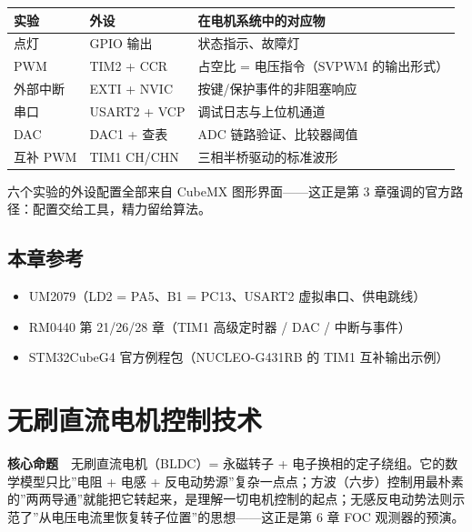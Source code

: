 \documentclass[
  UTF8,
  scheme=plain,
  fontsize=10pt,
  openany
]{ctexbook}
\begin{document}
{\def\LTcaptype{none} %
\begin{longtable}[]{@{}lll@{}}
\toprule\noalign{}
实验 & 外设 & 在电机系统中的对应物 \\
\midrule\noalign{}
\endhead
\bottomrule\noalign{}
\endlastfoot
点灯 & GPIO 输出 & 状态指示、故障灯 \\
PWM & TIM2 + CCR & 占空比 = 电压指令（SVPWM 的输出形式） \\
外部中断 & EXTI + NVIC & 按键/保护事件的非阻塞响应 \\
串口 & USART2 + VCP & 调试日志与上位机通道 \\
DAC & DAC1 + 查表 & ADC 链路验证、比较器阈值 \\
互补 PWM & TIM1 CH/CHN & 三相半桥驱动的标准波形 \\
\end{longtable}
}

六个实验的外设配置全部来自 CubeMX 图形界面------这正是第 3
章强调的官方路径：配置交给工具，精力留给算法。

\section{本章参考}\label{ux672cux7ae0ux53c2ux8003-3}

\begin{itemize}
\tightlist
\item
  UM2079（LD2 = PA5、B1 = PC13、USART2 虚拟串口、供电跳线）
\item
  RM0440 第 21/26/28 章（TIM1 高级定时器 / DAC / 中断与事件）
\item
  STM32CubeG4 官方例程包（NUCLEO-G431RB 的 TIM1 互补输出示例）
\end{itemize}

\clearpage

\chapter{无刷直流电机控制技术}\label{ux65e0ux5237ux76f4ux6d41ux7535ux673aux63a7ux5236ux6280ux672f}

\begin{epigraph}

\textbf{核心命题}　无刷直流电机（BLDC）= 永磁转子 +
电子换相的定子绕组。它的数学模型只比''电阻 + 电感 +
反电动势源''复杂一点点；方波（六步）控制用最朴素的''两两导通''就能把它转起来，是理解一切电机控制的起点；无感反电动势法则示范了''从电压电流里恢复转子位置''的思想------这正是第
6 章 FOC 观测器的预演。

\end{epigraph}
\end{document}
